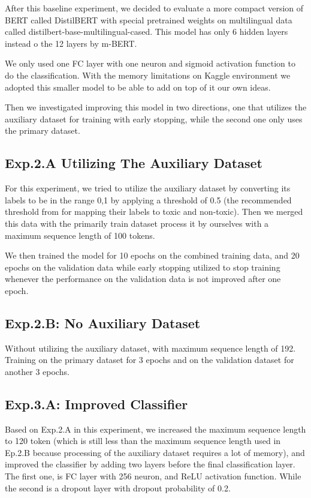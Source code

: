 \documentclass[10pt,twocolumn,letterpaper]{article}
\begin{document}
After this baseline experiment, we decided to evaluate a more compact version of BERT called DistilBERT with special pretrained weights on multilingual data called distilbert-base-multilingual-cased. This model has only 6 hidden layers instead o the 12 layers by m-BERT. 

We only used one FC layer with one neuron and sigmoid activation function to do the classification. With the memory  limitations on Kaggle environment we adopted this smaller model to be able to add on top of it our own ideas.

Then we investigated improving this model in two directions, one that utilizes the auxiliary dataset for training with early stopping, while the second one only uses the primary dataset.


\subsection{Exp.2.A Utilizing The Auxiliary Dataset}

For this experiment, we tried to utilize the auxiliary dataset by converting its labels to be in the range {0,1} by applying a threshold of 0.5 (the recommended threshold from \cite{Jigsaw2} for mapping their labels to toxic and non-toxic). Then we merged this data with the primarily train dataset process it by ourselves with a maximum sequence length of 100 tokens. 

We then trained the model for 10 epochs on the combined training data, and 20 epochs on the validation data while early stopping utilized to stop training whenever the performance on the validation data is not improved after one epoch. 

\subsection{Exp.2.B: No Auxiliary Dataset}

Without utilizing the auxiliary dataset, with maximum sequence length of 192. Training on the primary dataset for 3
epochs and on the validation dataset for another 3 epochs.

\subsection{Exp.3.A: Improved Classifier}

Based on Exp.2.A in this experiment, we increased the maximum sequence length to 120 token (which is still less than the maximum sequence length used in Ep.2.B because processing of the auxiliary dataset requires a lot of memory), and improved the classifier by adding two layers before the final classification layer. The first one, is FC layer with 256 neuron, and ReLU activation function. While the second is a dropout layer with dropout probability of 0.2.
\end{document}
